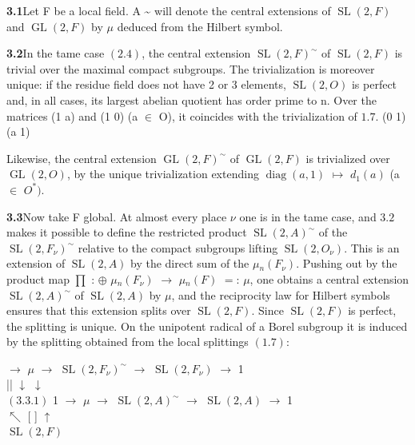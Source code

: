 \documentclass[10pt,a4paper]{article}
\begin{document}
\clearpage
{}
\label{d035-physical-016}
\par\medskip{}\par\smallskip
\par\noindent\textbf{3.1}\quad Let F be a local field. A \textasciitilde{} will denote the central extensions of $\operatorname{SL}(2,F)$ and $\operatorname{GL}(2,F)$ by $\mu{}$ deduced from the Hilbert symbol.\par
\par\noindent\textbf{3.2}\quad In the tame case $(2.4)$, the central extension $\operatorname{SL}(2,F)^\sim$ of $\operatorname{SL}(2,F)$ is trivial over the maximal compact subgroups. The trivialization is moreover unique: if the residue field does not have 2 or 3 elements, $\operatorname{SL}(2,O)$ is perfect and, in all cases, its largest abelian quotient has order prime to n. Over the matrices (1 a) and (1 0) (a $\in{}$ O), it coincides with the trivialization of $1.7$. (0 1) (a 1)\par
\par Likewise, the central extension $\operatorname{GL}(2,F)^\sim$ of $\operatorname{GL}(2,F)$ is trivialized over $\operatorname{GL}(2,O)$, by the unique trivialization extending $\operatorname{diag}(a,1)$ $\mapsto{}$ $d_1(a)$ (a $\in{}$ $O^*)$.\par
\par\noindent\textbf{3.3}\quad Now take F global. At almost every place $\nu{}$ one is in the tame case, and $3.2$ makes it possible to define the restricted product $\operatorname{SL}(2,A)^\sim$ of the $\operatorname{SL}(2,F_\nu{})^\sim$ relative to the compact subgroups lifting $\operatorname{SL}(2,O_\nu{})$. This is an extension of $\operatorname{SL}(2,A)$ by the direct sum of the $\mu{}_n(F_\nu{})$. Pushing out by the product map $\prod{}$ : $\oplus{}$ $\mu{}_n(F_\nu{})$ $\to{}$ $\mu{}_n(F)$ $=$: $\mu{}$, one obtains a central extension $\operatorname{SL}(2,A)^\sim$ of $\operatorname{SL}(2,A)$ by $\mu{}$, and the reciprocity law for Hilbert symbols ensures that this extension splits over $\operatorname{SL}(2,F)$. Since $\operatorname{SL}(2,F)$ is perfect, the splitting is unique. On the unipotent radical of a Borel subgroup it is induced by the splitting obtained from the local splittings $(1.7)$:\par
\par\smallskip\begin{center}\begin{minipage}{0.96\textwidth} $\to{}$ $\mu{}$ $\to{}$ $\operatorname{SL}(2,F_\nu{})^\sim$ $\to{}$ $\operatorname{SL}(2,F_\nu{})$ $\to{}$ 1 \\ || $\downarrow{}$ $\downarrow{}$ \\ $(3.3.1)$ 1 $\to{}$ $\mu{}$ $\to{}$ $\operatorname{SL}(2,A)^\sim$ $\to{}$ $\operatorname{SL}(2,A)$ $\to{}$ 1 \\ $\nwarrow{}$ [ ] $\uparrow{}$ \\ $\operatorname{SL}(2,F)$
\end{minipage}\end{center}\smallskip
\end{document}
